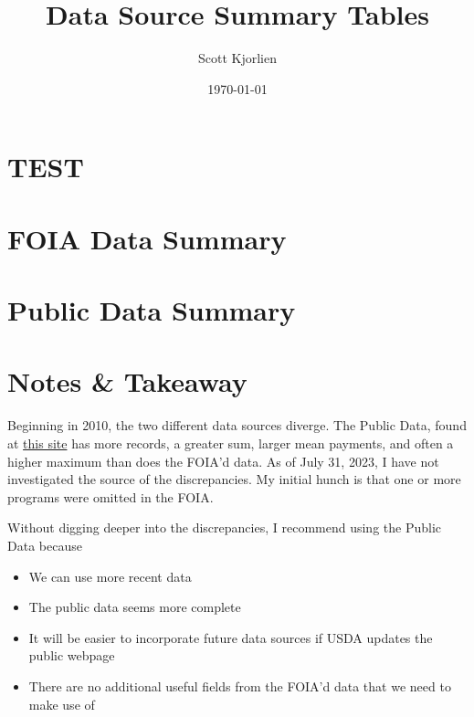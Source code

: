 \documentclass{article}
\title{Data Source Summary Tables}
\author{Scott Kjorlien}
\date{\today}
\begin{document}
\maketitle

\section*{TEST}



\section*{FOIA Data Summary}


\newpage
\section*{Public Data Summary}


\section*{Notes \& Takeaway}
Beginning in 2010, the two different data sources diverge. The Public Data, found at 
\href{https://www.fsa.usda.gov/news-room/efoia/electronic-reading-room/frequently-requested-information/payment-files-information/index}{this site}
has more records, a greater sum, larger mean payments, and often a higher maximum than does the 
FOIA'd data. As of July 31, 2023, I have not investigated the source of the discrepancies. My initial hunch  
is that one or more programs were omitted in the FOIA. 

Without digging deeper into the discrepancies, I recommend using the Public Data because 
\begin{itemize}
    \item We can use more recent data 
    \item The public data seems more complete 
    \item It will be easier to incorporate future data sources if USDA updates the public webpage
    \item There are no additional useful fields from the FOIA'd data that we need to make use of
\end{itemize}
\end{document}
